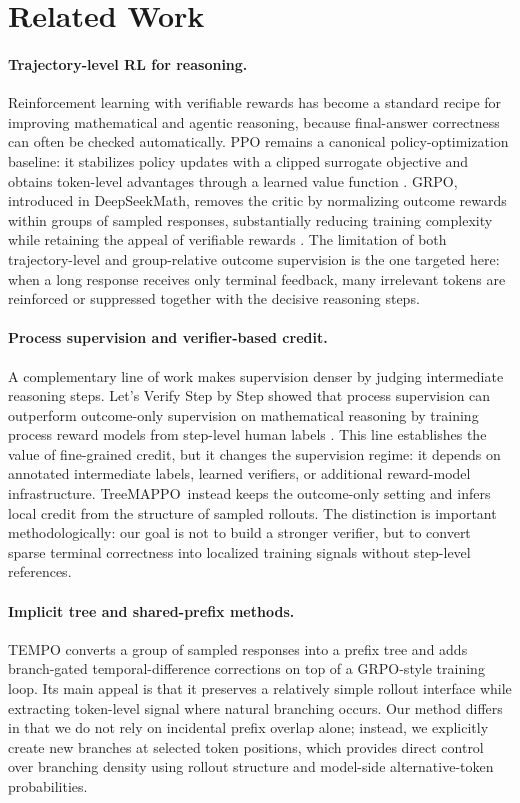 \documentclass{article}
\newcommand{\ours}{TreeMAPPO}
\begin{document}
\section{Related Work}
\paragraph{Trajectory-level RL for reasoning.}
Reinforcement learning with verifiable rewards has become a standard recipe for improving mathematical and agentic reasoning, because final-answer correctness can often be checked automatically. PPO remains a canonical policy-optimization baseline: it stabilizes policy updates with a clipped surrogate objective and obtains token-level advantages through a learned value function \cite{ppo17}. GRPO, introduced in DeepSeekMath, removes the critic by normalizing outcome rewards within groups of sampled responses, substantially reducing training complexity while retaining the appeal of verifiable rewards \cite{deepseekmath2024}. The limitation of both trajectory-level and group-relative outcome supervision is the one targeted here: when a long response receives only terminal feedback, many irrelevant tokens are reinforced or suppressed together with the decisive reasoning steps.

\paragraph{Process supervision and verifier-based credit.}
A complementary line of work makes supervision denser by judging intermediate reasoning steps. Let’s Verify Step by Step showed that process supervision can outperform outcome-only supervision on mathematical reasoning by training process reward models from step-level human labels \cite{lightman2023letsverify}. This line establishes the value of fine-grained credit, but it changes the supervision regime: it depends on annotated intermediate labels, learned verifiers, or additional reward-model infrastructure. \ours\ instead keeps the outcome-only setting and infers local credit from the structure of sampled rollouts. The distinction is important methodologically: our goal is not to build a stronger verifier, but to convert sparse terminal correctness into localized training signals without step-level references.

\paragraph{Implicit tree and shared-prefix methods.}
TEMPO \cite{tempo2025} converts a group of sampled responses into a prefix tree and adds branch-gated temporal-difference corrections on top of a GRPO-style training loop. Its main appeal is that it preserves a relatively simple rollout interface while extracting token-level signal where natural branching occurs. Our method differs in that we do not rely on incidental prefix overlap alone; instead, we explicitly create new branches at selected token positions, which provides direct control over branching density using rollout structure and model-side alternative-token probabilities.
\end{document}
